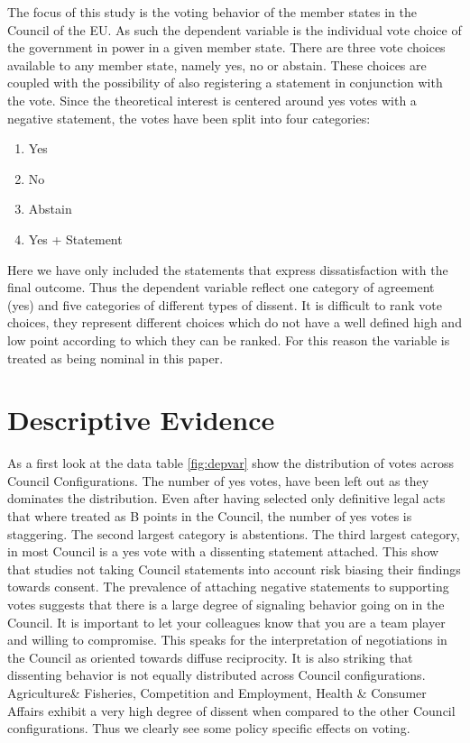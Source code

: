 The focus of this study is the voting behavior of the member states in the Council of the EU. As such the dependent variable is the individual vote choice of the government in power in a given member state. There are three vote choices available to any member state, namely yes, no or abstain. These choices are coupled with the possibility of also registering a statement in conjunction with the vote. Since the theoretical interest is centered around yes votes with a negative statement, the votes have been split into four categories:

\begin{enumerate}
\item Yes
\item No
\item Abstain
\item Yes + Statement
\end{enumerate}

Here we have only included the statements that express dissatisfaction with the final outcome. Thus the dependent variable reflect one category of agreement (yes) and five categories of different types of dissent. It is difficult to rank vote choices, they represent different choices which do not have a well defined high and low point according to which they can be ranked. For this reason the variable is treated as being nominal in this paper. 

\section{Descriptive Evidence}
As a first look at the data table \ref{fig:depvar} show the distribution of votes across Council Configurations. The number of yes votes, have been left out as they dominates the distribution. Even after having selected only definitive legal acts that where treated as B points in the Council, the number of yes votes is staggering. The second largest category is abstentions. The third largest category, in most Council is a yes vote with a dissenting statement attached. This show that studies not taking Council statements into account risk biasing their findings towards consent. The prevalence of attaching negative statements to supporting votes suggests that there is a large degree of signaling behavior going on in the Council. It is important to let your colleagues know that you are a team player and willing to compromise. This speaks for the interpretation of negotiations in the Council as oriented towards diffuse reciprocity. It is also striking that dissenting behavior is not equally distributed across Council configurations. Agriculture\& Fisheries, Competition and Employment, Health \& Consumer Affairs exhibit a very high degree of dissent when compared to the other Council configurations. Thus we clearly see some policy specific effects on voting.

